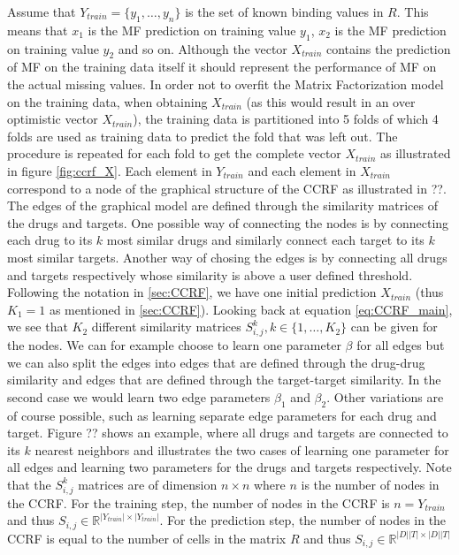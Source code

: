 Assume that $Y_{train} = \{y_1, \dots, y_n\}$ is the set of known binding values in $R$. This means that $x_1$ is the MF prediction on training value $y_1$, $x_2$ is the MF prediction on training value $y_2$ and so on. Although the vector $X_{train}$ contains the prediction of MF on the training data itself it should represent the performance of MF on the actual missing values. In order not to overfit the Matrix Factorization model on the training data, when obtaining $X_{train}$ (as this would result in an over optimistic vector $X_{train}$), the training data is partitioned into 5 folds of which 4 folds are used as training data to predict the fold that was left out. The procedure is repeated for each fold to get the complete vector $X_{train}$ as illustrated in figure \ref{fig:ccrf_X}. Each element in $Y_{train}$ and each element in $X_{train}$ correspond to a node of the graphical structure of the CCRF as illustrated in ??. The edges of the graphical model are defined through the similarity matrices of the drugs and targets. One possible way of connecting the nodes is by connecting each drug to its $k$ most similar drugs and similarly connect each target to its $k$ most similar targets. Another way of chosing the edges is by connecting all drugs and targets respectively whose similarity is above a user defined threshold. Following the notation in \ref{sec:CCRF}, we have one initial prediction $X_{train}$ (thus $K_1=1$ as mentioned in \ref{sec:CCRF}). Looking back at equation \ref{eq:CCRF_main}, we see that $K_2$ different similarity matrices $S_{i,j}^k, k \in \{1,\dots,K_2\}$ can be given for the nodes. We can for example choose to learn one parameter $\beta$ for all edges but we can also split the edges into edges that are defined through the drug-drug similarity and edges that are defined through the target-target similarity. In the second case we would learn two edge parameters $\beta_1$ and $\beta_2$. Other variations are of course possible, such as learning separate edge parameters for each drug and target. Figure ?? shows an example, where all drugs and targets are connected to its $k$ nearest neighbors and illustrates the two cases of learning one parameter for all edges and learning two parameters for the drugs and targets respectively. Note that the $S_{i,j}^k$ matrices are of dimension $n \times n$ where $n$ is the number of nodes in the CCRF. For the training step, the number of nodes in the CCRF is $n = Y_{train}$
 and thus $S_{i,j} \in \mathbb{R}^{|Y_{train}| \times |Y_{train}|}$. For the prediction step, the number of nodes in the CCRF is equal to the number of cells in the matrix $R$ and thus $S_{i,j} \in \mathbb{R}^{|D||T| \times |D||T|}$

